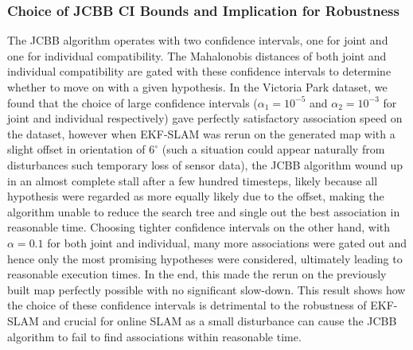 \subsubsection{Choice of JCBB CI Bounds and Implication for Robustness}
The JCBB algorithm operates with two confidence intervals, one for joint and one for individual compatibility. The Mahalonobis distances of both joint and individual compatibility are gated with these confidence intervals to determine whether to move on with a given hypothesis.\cite{jcbb} In the Victoria Park dataset, we found that the choice of large confidence intervals ($\alpha_1 = 10^{-5}$ and $\alpha_2 = 10^{-3}$ for joint and individual respectively) gave perfectly satisfactory association speed on the dataset, however when EKF-SLAM was rerun on the generated map with a slight offset in orientation of $6^\circ$ (such a situation could appear naturally from disturbances such temporary loss of sensor data), the JCBB algorithm wound up in an almost complete stall after a few hundred timesteps, likely because all hypothesis were regarded as more equally likely due to the offset, making the algorithm unable to reduce the search tree and single out the best association in reasonable time. Choosing tighter confidence intervals on the other hand, with $\alpha = 0.1$ for both joint and individual, many more associations were gated out and hence only the most promising hypotheses were considered, ultimately leading to reasonable execution times. In the end, this made the rerun on the previously built map perfectly possible with no significant slow-down. This result shows how the choice of these confidence intervals is detrimental to the robustness of EKF-SLAM and crucial for online SLAM as a small disturbance can cause the JCBB algorithm to fail to find associations within reasonable time.

